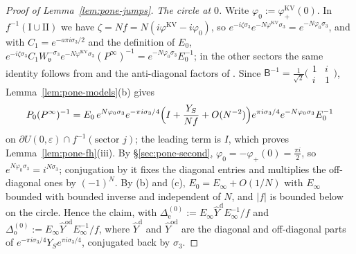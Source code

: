 \begin{proof}[Proof of Lemma~\textup{\ref{lem:pone-jumps}}]
\emph{The circle at $0$.} Write $\varphi_0:=\varphi^{\mathrm{KV}}_+(0)$. In $f^{-1}(\mathrm I\cup\mathrm{II})$ we have
$\zeta=Nf=N(i\varphi^{\mathrm{KV}}-i\varphi_0)$, so $e^{-i\zeta\sigma_3}e^{-N\varphi^{\mathrm{KV}}\sigma_3}=e^{-N\varphi_0\sigma_3}$, and with
$C_1=e^{-a\pi i\sigma_3/2}$ and the definition of $E_0$,
$e^{-i\zeta\sigma_3}C_1W_{\mathfrak v}^{-\sigma_3}e^{-N\varphi^{\mathrm{KV}}\sigma_3}(P^\infty)^{-1}=e^{-N\varphi_0\sigma_3}E_0^{-1}$; in the other sectors
the same identity follows from \cite[(5.28)--(5.30)]{KV} and the anti-diagonal factors of \cite[(4.45)--(4.46)]{Van}.
Since $\mathsf B^{-1}=\frac1{\sqrt2}\bigl(\begin{smallmatrix}1&i\\i&1\end{smallmatrix}\bigr)$, Lemma~\ref{lem:pone-models}(b) gives
\[
  P_0(P^\infty)^{-1}=E_0\,e^{N\varphi_0\sigma_3}e^{-\pi i\sigma_3/4}\Bigl(I+\frac{Y_S}{Nf}+O(N^{-2})\Bigr)
  e^{\pi i\sigma_3/4}e^{-N\varphi_0\sigma_3}E_0^{-1}
\]
on $\partial U(0,\varepsilon)\cap f^{-1}(\text{sector }j)$; the leading term is $I$, which proves Lemma~\ref{lem:pone-fh}(iii).
By \S\ref{sec:pone-second}, $\varphi_0=-\varphi_+(0)=\frac{\pi i}2$, so $e^{N\varphi_0\sigma_3}=i^{N\sigma_3}$; conjugation by it fixes
the diagonal entries and multiplies the off-diagonal ones by $(-1)^N$. By (b) and (c), $E_0=E_\infty+O(1/N)$ with $E_\infty$
bounded with bounded inverse and independent of $N$, and $|f|$ is bounded below on the circle. Hence the claim, with
$\Delta^{(0)}_{\mathrm e}:=E_\infty\hat Y^{\mathrm d}E_\infty^{-1}/f$ and $\Delta^{(0)}_{\mathrm o}:=E_\infty\hat Y^{\mathrm{od}}E_\infty^{-1}/f$,
where $\hat Y^{\mathrm d}$ and $\hat Y^{\mathrm{od}}$ are the diagonal and off-diagonal parts of $e^{-\pi i\sigma_3/4}Y_Se^{\pi i\sigma_3/4}$,
conjugated back by $\sigma_3$.
\end{proof}
